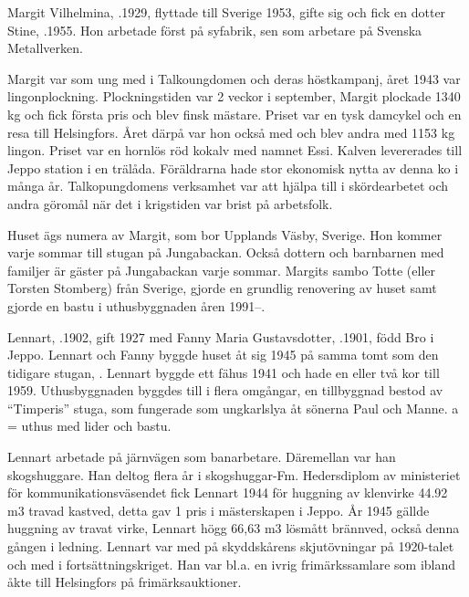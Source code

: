 Margit Vilhelmina, .1929, flyttade till Sverige 1953, gifte sig och fick en dotter Stine, .1955. Hon arbetade först på syfabrik, sen som arbetare på Svenska Metallverken.

Margit var som ung med i Talkoungdomen och deras höstkampanj, året 1943 var lingonplockning. Plockningstiden var 2 veckor i september, Margit plockade 1340 kg och fick första pris och blev finsk mästare. Priset var en tysk damcykel och en resa till Helsingfors. Året därpå var hon också med och blev andra med 1153 kg lingon. Priset var en hornlös röd kokalv med namnet Essi. Kalven levererades till Jeppo station i en trälåda. Föräldrarna hade stor ekonomisk nytta av denna ko i många år. Talkopungdomens verksamhet var att hjälpa till i skördearbetet och andra göromål när det i krigstiden var brist på arbetsfolk.

Huset ägs numera av Margit, som bor Upplands Väsby, Sverige. Hon kommer varje sommar till stugan på Jungabackan. Också dottern och barnbarnen med familjer är gäster på Jungabackan varje sommar. Margits sambo Totte (eller Torsten Stomberg)  från Sverige, gjorde en grundlig renovering av huset samt gjorde en bastu i uthusbyggnaden åren 1991--.



Lennart, .1902, gift 1927 med Fanny Maria Gustavsdotter, .1901, född Bro i Jeppo. Lennart och Fanny byggde huset åt sig 1945 på samma tomt som den tidigare stugan, . Lennart byggde ett fähus 1941 och hade en eller två kor till 1959. Uthusbyggnaden byggdes till i flera omgångar, en tillbyggnad bestod av ``Timperis'' stuga, som fungerade som ungkarlslya åt sönerna Paul och Manne. a = uthus med lider och bastu.

Lennart arbetade på järnvägen som banarbetare. Däremellan var han skogshuggare. Han deltog flera år i skogshuggar-Fm. Hedersdiplom av ministeriet för kommunikationsväsendet fick Lennart 1944 för huggning av klenvirke 44.92 m3 travad  kastved, detta gav 1 pris i mästerskapen i Jeppo. År 1945 gällde huggning av travat virke, Lennart högg 66,63 m3 lösmått brännved, också denna gången i ledning. Lennart var med på skyddskårens skjutövningar på 1920-talet och med i 	fortsättningskriget. Han var bl.a. en ivrig frimärkssamlare som ibland åkte till Helsingfors på frimärksauktioner.

